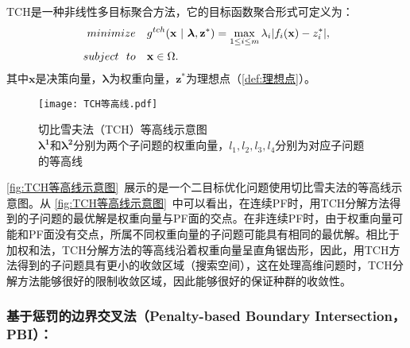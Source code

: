 TCH是一种非线性多目标聚合方法\cite{jaszkiewicz2002performance}，它的目标函数聚合形式可定义为：
\begin{align}
    \label{eq:TCH}
    minimize \quad & g^{tch}(\mathbf{x} \ | \ \boldsymbol{\lambda},\mathbf{z}^*) = \max_{1 \leq i \leq m} \lambda_i | f_i(\mathbf{x}) - z^*_i |, \\
    subject \ \ to \quad & \mathbf{x} \in \Omega. \notag
\end{align}
其中$\mathbf{x}$是决策向量，$\boldsymbol{\lambda}$为权重向量，$\mathbf{z}^*$为理想点（\autoref{def:理想点}）。
\par
\begin{figure}[htb]
    \texttt{[image: TCH等高线.pdf]}
    \caption[切比雪夫法（TCH）等高线示意图]{切比雪夫法（TCH）等高线示意图 \\ $\boldsymbol{\lambda^1}$和$\boldsymbol{\lambda^2}$分别为两个子问题的权重向量，$l_1, l_2, l_3, l_4$分别为对应子问题的等高线}
    \label{fig:TCH等高线示意图}
\end{figure}
\par
\autoref{fig:TCH等高线示意图}~展示的是一个二目标优化问题使用切比雪夫法的等高线示意图。从    \autoref{fig:TCH等高线示意图}~中可以看出，在连续PF时，用TCH分解方法得到的子问题的最优解是权重向量与PF面的交点。在非连续PF时，由于权重向量可能和PF面没有交点，所属不同权重向量的子问题可能具有相同的最优解。相比于加权和法，TCH分解方法的等高线沿着权重向量呈直角锯齿形，因此，用TCH方法得到的子问题具有更小的收敛区域（搜索空间），这在处理高维问题时，TCH分解方法能够很好的限制收敛区域，因此能够很好的保证种群的收敛性。

\subsubsection{基于惩罚的边界交叉法（Penalty-based Boundary Intersection，PBI）：}

